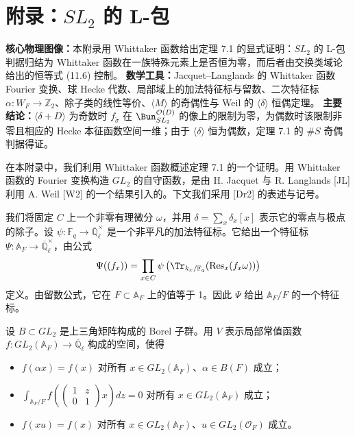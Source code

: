 

\section{附录：\texorpdfstring{$SL_2$}{SL2} 的 L-包}

\begin{keytakeaway}
\textbf{核心物理图像：}本附录用 Whittaker 函数给出定理 7.1 的显式证明：$SL_2$ 的 L-包判据归结为 Whittaker 函数在一族特殊元素上是否恒为零，而后者由交换类域论给出的恒等式 (11.6) 控制。
\textbf{数学工具：}Jacquet--Langlands 的 Whittaker 函数 Fourier 变换、球 Hecke 代数、局部域上的加法特征标与留数、二次特征标 $\alpha: W_F\to\mathbb{Z}_2$、除子类的线性等价、$\langle M\rangle$ 的奇偶性与 Weil 的 $\langle\delta\rangle$ 恒偶定理。
\textbf{主要结论：}$\langle\delta+D\rangle$ 为奇数时 $f_{\tilde\sigma}$ 在 $\Bun^{\mathcal{O}(D)}_{SL_2}$ 的像上的限制为零，为偶数时该限制非零且相应的 Hecke 本征函数空间一维；由于 $\langle\delta\rangle$ 恒为偶数，定理 7.1 的 $\#S$ 奇偶判据得证。
\end{keytakeaway}

在本附录中，我们利用 Whittaker 函数概述定理 7.1 的一个证明。用 Whittaker 函数的 Fourier 变换构造 $GL_2$ 的自守函数，是由 H. Jacquet 与 R. Langlands [JL] 利用 A. Weil [W2] 的一个结果引入的。下文我们采用 [Dr2] 的表述与记号。

我们将固定 $C$ 上一个非零有理微分 $\omega$，并用 $\delta=\sum_x\delta_x[x]$ 表示它的零点与极点的除子。设 $\psi:\mathbb{F}_q\to\overline{\mathbb{Q}}_\ell^\times$ 是一个非平凡的加法特征标。它给出一个特征标 $\Psi:\mathbb{A}_F\to\overline{\mathbb{Q}}_\ell^\times$，由公式
\[
\Psi((f_x)) = \prod_{x\in C}\psi\left(\Tr_{k_x/\mathbb{F}_q}(\operatorname{Res}_x(f_x\omega))\right)
\]
定义。由留数公式，它在 $F\subset\mathbb{A}_F$ 上的值等于 1。因此 $\Psi$ 给出 $\mathbb{A}_F/F$ 的一个特征标。

设 $B\subset GL_2$ 是上三角矩阵构成的 Borel 子群。用 $V$ 表示局部常值函数 $f:GL_2(\mathbb{A}_F)\to\overline{\mathbb{Q}}_\ell$ 构成的空间，使得
\begin{itemize}[leftmargin=2.2em,itemsep=2pt,topsep=2pt]
\item[(1)] $f(\alpha x)=f(x)$ 对所有 $x\in GL_2(\mathbb{A}_F)$、$\alpha\in B(F)$ 成立；
\item[(2)] $\displaystyle\int_{\mathbb{A}_F/F}f\left(\begin{pmatrix}1&z\\ 0&1\end{pmatrix}x\right)dz=0$ 对所有 $x\in GL_2(\mathbb{A}_F)$ 成立；
\item[(3)] $f(xu)=f(x)$ 对所有 $x\in GL_2(\mathbb{A}_F)$、$u\in GL_2(\mathcal{O}_F)$ 成立。
\end{itemize}

